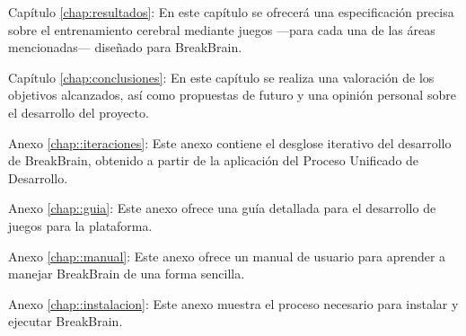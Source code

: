 \begin{definitionlist}
\item [Capítulo \ref{chap:resultados}: \nameref{chap:resultados}] En este capítulo se ofrecerá una especificación precisa sobre el entrenamiento cerebral mediante juegos ---para cada una de las áreas mencionadas--- diseñado para BreakBrain.

\item [Capítulo \ref{chap:conclusiones}: \nameref{chap:conclusiones}] En este capítulo se realiza una valoración de los objetivos alcanzados, así como propuestas de futuro y una opinión personal sobre el desarrollo del proyecto.

\item [Anexo \ref{chap::iteraciones}: \nameref{chap::iteraciones}] Este anexo contiene el desglose iterativo del desarrollo de BreakBrain, obtenido a partir de la aplicación del Proceso Unificado de Desarrollo.

\item [Anexo \ref{chap::guia}: \nameref{chap::guia}] Este anexo ofrece una guía detallada para el desarrollo de juegos para la plataforma.

\item [Anexo \ref{chap::manual}: \nameref{chap::manual}] Este anexo ofrece un manual de usuario para aprender a manejar BreakBrain de una forma sencilla.

\item [Anexo \ref{chap::instalacion}: \nameref{chap::instalacion}] Este anexo muestra el proceso necesario para instalar y ejecutar BreakBrain.
\end{definitionlist}

